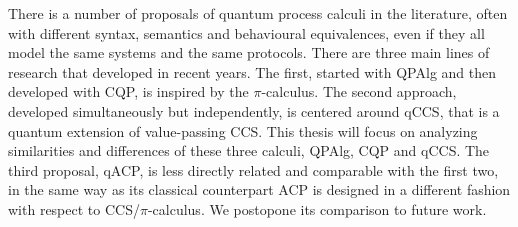 There is a number of proposals of quantum process calculi in the literature, often with different syntax, semantics and behavioural equivalences, even if they all model the same systems and the same protocols. 
There are three main lines of research that developed in recent years. The first, started with QPAlg and then developed with CQP, is inspired by the $\pi$-calculus. 
The second approach, developed simultaneously but independently, is centered around qCCS, that is a quantum extension of value-passing CCS. 
This thesis will focus on analyzing similarities and differences of these three calculi, QPAlg, CQP and qCCS. 
The third proposal, qACP, is less directly related and comparable with the first two, in the same way as its classical counterpart ACP is designed in a different fashion with respect to CCS/$\pi$-calculus. We postopone its comparison to future work.
